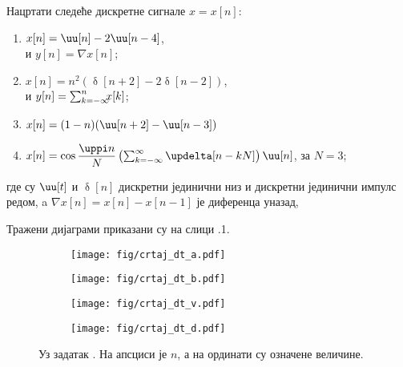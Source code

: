 \newpage
\noindent
\PID
Нацртати следеће
дискретне сигнале $x=x[n]$:
\begin{multicols}{2}
\begin{enumerate}[label=(\alph*)]
\item $x[n] = \uu[n] - 2\uu[n-4]$, \\ и 
$y[n] = \nabla x[n]$;
\item $x[n] = n^2( \updelta[n+2] - 2\updelta[n-2] )$, \\ и 
$y[n] = \sum_{k = -\infty}^n \hspace*{-0.5em}
 x[k]$;
\item $x[n] = (1-n)(\uu[n+2] - \uu[n-3])$
\item  $x[n] = \cos\dfrac{\uppi n}{N}  
\left(
\sum_{k = -\infty}^{\infty} \updelta[n-kN]
\right)  \uu[n] $, за $N = 3$;
\end{enumerate}
\end{multicols}
\noindent
где су $\uu[t]$ и $\updelta[n]$ дискретни 
јединични низ
и дискретни јединични импулс редом, a $\nabla x[n] = x[n] - x[n-1]$ је диференца уназад,
\vspace*{5mm}

\REZULTAT  
Тражени дијаграми приказани су 
на слици \ID.1. \\
\begin{figure}[ht!]
    \hspace*{0pt}\hfill
    \begin{subfigure}[c]{0.45\textwidth}
        \centering
        \texttt{[image: fig/crtaj\_dt\_a.pdf]}
        \caption{}
    \end{subfigure}
    \hspace*{0pt}\hfill
    \begin{subfigure}[c]{0.45\textwidth}
        \centering
        \texttt{[image: fig/crtaj\_dt\_b.pdf]}
        \caption{}
    \end{subfigure}
    \hfill
    \hspace*{0pt}

    \hspace*{0pt}\hfill
    \begin{subfigure}[c]{0.45\textwidth}
        \centering
        \texttt{[image: fig/crtaj\_dt\_v.pdf]}
        \caption{}
    \end{subfigure}
    \hspace*{0pt}\hfill
    \begin{subfigure}[c]{0.45\textwidth}
        \centering
        \texttt{[image: fig/crtaj\_dt\_d.pdf]}
        \caption{}
    \end{subfigure}
    \hfill
    \hspace*{0pt}
    \caption{Уз задатак \ID. На апсциси је $n$, а на ординати су означене величине.}
\end{figure}